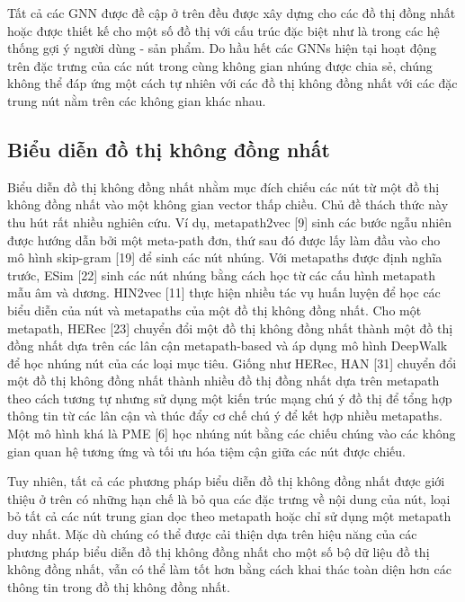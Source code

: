 Tất cả các GNN được đề cập ở trên đều được xây dựng cho các đồ thị đồng nhất hoặc được thiết kế cho một số đồ thị với cấu trúc đặc biệt như là trong các hệ thống gợi ý người dùng - sản phẩm. Do hầu hết các GNNs hiện tại hoạt động trên đặc trưng của các nút trong cùng không gian nhúng được chia sẻ, chúng không thể đáp ứng một cách tự nhiên với các đồ thị không đồng nhất với các đặc trung nút nằm trên các không gian khác nhau.

\subsection[short]{Biểu diễn đồ thị không đồng nhất}
Biểu diễn đồ thị không đồng nhất nhằm mục đích chiếu các nút từ một đồ thị không đồng nhất vào một không gian vector thấp chiều. Chủ đề thách thức này thu hút rất nhiều nghiên cứu. Ví dụ, metapath2vec [9] sinh các bước ngẫu nhiên được hướng dẫn bởi một meta-path đơn, thứ sau đó được lấy làm đầu vào cho mô hình skip-gram [19] để sinh các nút nhúng. Với metapaths được định nghĩa trước, ESim [22] sinh các nút nhúng bằng cách học từ các cấu hình metapath mẫu âm và dương. HIN2vec [11] thực hiện nhiều tác vụ huấn luyện để học các biểu diễn của nút và metapaths của một đồ thị không đồng nhất. Cho một metapath, HERec [23] chuyển đổi một đồ thị không đồng nhất thành một đồ thị đồng nhất dựa trên các lân cận metapath-based và áp dụng mô hình DeepWalk  để học nhúng nút của các loại mục tiêu. Giống như HERec, HAN [31] chuyển đổi một đồ thị không đồng nhất thành nhiều đồ thị đồng nhất dựa trên metapath theo cách tương tự nhưng sử dụng một kiến trúc mạng chú ý đồ thị để tổng hợp thông tin từ các lân cận và thúc đẩy cơ chế chú ý để kết hợp nhiều metapaths. Một mô hình khá là PME [6] học nhúng nút bằng các chiếu chúng vào các không gian quan hệ tương ứng và tối ưu hóa tiệm cận giữa các nút được chiếu.

Tuy nhiên, tất cả các phương pháp biểu diễn đồ thị không đồng nhất được giới thiệu ở trên có những hạn chế là bỏ qua các đặc trưng về nội dung của nút, loại bỏ tất cả các nút trung gian dọc theo metapath hoặc chỉ sử dụng một metapath duy nhất. Mặc dù chúng có thể được cải thiện dựa trên hiệu năng của các phương pháp biểu diễn đồ thị không đồng nhất cho một số bộ dữ liệu đồ thị không đồng nhất, vẫn có thể làm tốt hơn bằng cách khai thác toàn diện hơn các thông tin trong đồ thị không đồng nhất. 